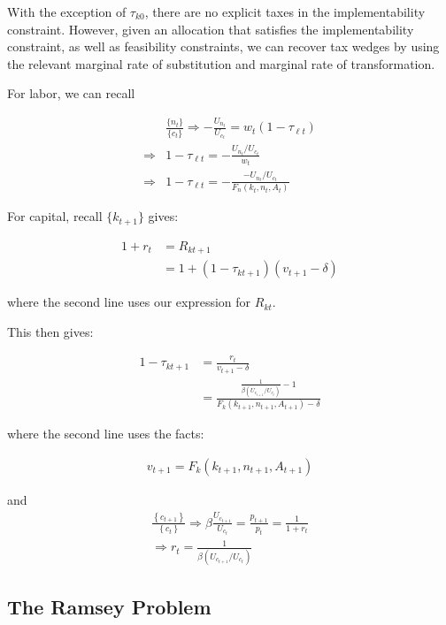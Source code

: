 \documentclass[10pt]{article}
\begin{document}
With the exception of $\tau_{k 0}$, there are no explicit taxes in the implementability constraint. However, given an allocation that satisfies the implementability constraint, as well as feasibility constraints, we can recover tax wedges by using the relevant marginal rate of substitution and marginal rate of transformation.

For labor, we can recall 

\begin{align}
    &\frac{\{n_t\}}{\{c_t\}} \Rightarrow -\frac{U_{n_t}}{U_{c_t}}=w_t\left(1-\tau_{\ell t}\right) \\
    \Rightarrow &1 - \tau_{\ell t} = -\frac{U_{n_t}/U_{c_t}}{w_t} \\
    \Rightarrow &1 - \tau_{\ell t} =   -\frac{-U_{n_t}/U_{c_t}}{F_n\left(k_t, n_t, A_t\right)}
\end{align}

For capital, recall $\{k_{t+1}\}$ gives:

\begin{align}
    1+r_t&=R_{k t+1} \\
    &= 1+\left(1-\tau_{k t+1}\right)\left(v_{t+1}-\delta\right)
\end{align}

where the second line uses our expression for $R_{k t}$.

This then gives: 

\begin{align}
    1-\tau_{k t+1}&=\frac{r_t}{v_{t+1}-\delta} \\
    &=\frac{\frac{1}{\beta\left(U_{c_{t+1}} / U_{c_t}\right)}-1}{F_k\left(k_{t+1}, n_{t+1}, A_{t+1}\right)-\delta}
\end{align}

where the second line uses the facts:

\begin{align}
    v_{t+1} = F_k\left(k_{t+1}, n_{t+1}, A_{t+1}\right) 
\end{align}

and 
\begin{align}
    \frac{\left\{c_{t+1}\right\}}{\left\{c_t\right\}} \Rightarrow \beta \frac{U_{c_{t+1}}}{U_{c_t}}=\frac{p_{t+1}}{p_t}=\frac{1}{1+r_t} \\
    \Rightarrow r_t = \frac{1}{\beta\left(U_{c_{t+1}} / U_{c_t}\right)}
\end{align}

\subsection{The Ramsey Problem}
\end{document}
